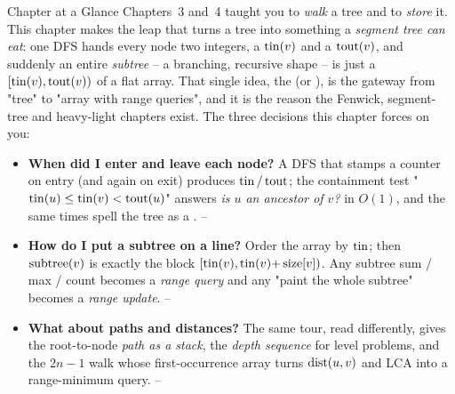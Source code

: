 
\begin{chaptertheorybox}{Chapter at a Glance}
Chapters~3 and~4 taught you to \emph{walk} a tree and to \emph{store} it. This chapter
makes the leap that turns a tree into something a \emph{segment tree can eat}: one DFS
hands every node two integers, a  $\operatorname{tin}(v)$ and a 
$\operatorname{tout}(v)$, and suddenly an entire \emph{subtree} -- a branching, recursive shape -- is
just a  $[\operatorname{tin}(v), \operatorname{tout}(v))$ of a flat array. That single idea,
the  (or ), is the gateway from "tree" to "array with
range queries", and it is the reason the Fenwick, segment-tree and heavy-light chapters
exist. The three decisions this chapter forces on you:

\begin{itemize}[nosep]
  \item \textbf{When did I enter and leave each node?} A DFS that stamps a counter on
        entry (and again on exit) produces $\operatorname{tin}/\operatorname{tout}$; the containment test
        "$\operatorname{tin}(u) \le \operatorname{tin}(v) < \operatorname{tout}(u)$" answers \emph{is $u$ an ancestor of $v$?} in
        $O(1)$, and the same times spell the tree as a .
        \hfill {}--
  \item \textbf{How do I put a subtree on a line?} Order the array by $\operatorname{tin}$; then
        $\operatorname{subtree}(v)$ is exactly the block $[\operatorname{tin}(v), \operatorname{tin}(v){+}\operatorname{size}[v])$. Any subtree
        sum / max / count becomes a \emph{range query} and any "paint the whole subtree"
        becomes a \emph{range update}.   \hfill {}--
  \item \textbf{What about paths and distances?} The same tour, read differently, gives
        the root-to-node \emph{path as a stack}, the \emph{depth sequence} for level
        problems, and the $2n{-}1$ walk whose first-occurrence array turns
        $\operatorname{dist}(u,v)$ and LCA into a range-minimum query.   \hfill {}--
\end{itemize}


\end{chaptertheorybox}
